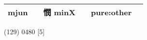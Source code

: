 \documentclass[14pt,a4paper]{scrartcl}
\begin{document}
\begin{longtable}[c]{@{}llllll@{}}
\begin{minipage}[t]{0.14\columnwidth}\raggedright\strut
mjun
\strut\end{minipage} &
\begin{minipage}[t]{0.14\columnwidth}\raggedright\strut
\strut\end{minipage} &
\begin{minipage}[t]{0.14\columnwidth}\raggedright\strut
憫 minX
\strut\end{minipage} &
\begin{minipage}[t]{0.14\columnwidth}\raggedright\strut
\strut\end{minipage} &
\begin{minipage}[t]{0.14\columnwidth}\raggedright\strut
pure:other
\strut\end{minipage}\tabularnewline
\bottomrule
\end{longtable}

(129) 0480 {[}5{]}
\end{document}
